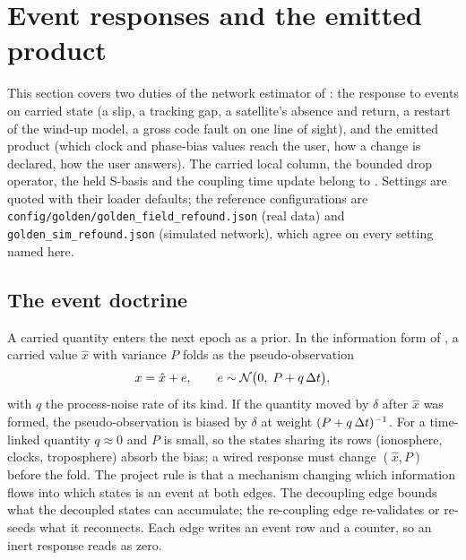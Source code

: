 \documentclass[main.tex]{subfiles}
\begin{document}

\section{Event responses and the emitted product}\label{sec:net-wire}

\providecommand{\wireWuHorizon}{T_{\mathrm{wu}}}  %
\providecommand{\wirePlHorizon}{T_{\mathrm{pl}}}  %
\providecommand{\wireHoldGap}{T_{\mathrm{h}}}     %
\providecommand{\wireRdHorizon}{T_{\mathrm{rd}}}  %
\providecommand{\wireWrap}{\operatorname{w}}
\providecommand{\wireMed}{\operatorname*{med}}

This section covers two duties of the network estimator of
: the response to events on
carried state (a slip, a tracking gap, a satellite's absence and return,
a restart of the wind-up model, a gross code fault on one line of sight),
and the emitted product (which clock and phase-bias values reach the user,
how a change is declared, how the user answers). The carried local column,
the bounded drop operator, the held S-basis and the coupling time update
belong to .
Settings are quoted with their loader defaults; the reference
configurations are \texttt{config/golden/golden\_field\_refound.json} (real
data) and \texttt{golden\_sim\_refound.json} (simulated network), which
agree on every setting named here.

\subsection{The event doctrine}\label{sec:net-wire-doctrine}

A carried quantity enters the next epoch as a prior. In the information
form of , a
carried value $\hat x$ with variance $P$ folds as the pseudo-observation
\begin{equation}
x = \hat x + e, \qquad e \sim \mathcal{N}\big(0,\; P + q\,\Delta t\big),
\label{eq:wire-prior}
\end{equation}
with $q$ the process-noise rate of its kind. If the quantity moved by
$\delta$ after $\hat x$ was formed, the pseudo-observation is biased by
$\delta$ at weight $(P + q\,\Delta t)^{-1}$. For a time-linked quantity
$q \approx 0$ and $P$ is small, so the states sharing its rows
(ionosphere, clocks, troposphere) absorb the bias; a wired response must
change $(\hat x, P)$ before the fold. The project rule is that a mechanism
changing which information flows into which states is an event at both
edges. The decoupling edge bounds what the decoupled states can accumulate;
the re-coupling edge re-validates or re-seeds what it reconnects. Each edge
writes an event row and a counter, so an inert response reads as zero.
\end{document}

